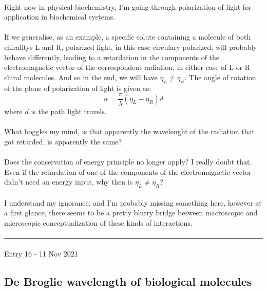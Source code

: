 \documentclass[12pt,  letterpaper]{article}
\begin{document}
\paragraph*{}
Right now in physical biochemistry, I'm going through polarization of light for application in biochemical systems.\paragraph*{}
If we generalise, as an example, a specific solute containing a molecule of both chiralitys L and R, polarized light, in this case circulary polarized, will probably behave differently, leading to a retardation in the components of the electromagnetic vector of the correspondent radiation, in either case of L or R chiral molecules. And so in the end, we will have $\eta_{L} \neq \eta_{R}$. The angle of rotation of the plane of polarization of light is given as:
\begin{equation}
\alpha = \frac{\pi}{\lambda}(\eta_{L} - \eta_{R})d
\end{equation}
where $d$ is the path light travels.
\paragraph*{}
What boggles my mind, is that apparently the wavelenght of the radiation that got retarded, is apparently the same? 
\paragraph*{}
Does the conservation of energy principle no longer apply? I really doubt that. Even if the retardation of one of the components of the electromagnetic vector didn't need an energy input, why then is $\eta_{L} \neq \eta_{R}$?\paragraph*{}
I understand my ignorance, and I'm probably missing something here, however at a first glance, there seems to be a pretty blurry bridge between macroscopic and microscopic conceptualization of these kinds of interactions.
\paragraph*{}
\hrule
\paragraph*{}
Entry 16 - 11 Nov 2021
\subsection*{De Broglie wavelength of biological molecules}
\end{document}

